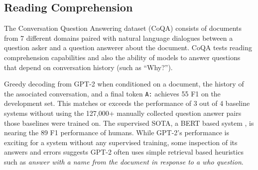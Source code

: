 \documentclass{article}
\begin{document}
\subsection{Reading Comprehension}
\label{qa}

The Conversation Question Answering dataset (CoQA) \citet{reddy2018coqa} consists of documents from 7 different domains paired with natural language dialogues between a question asker and a question answerer about the document. CoQA tests reading comprehension capabilities and also the ability of models to answer questions that depend on conversation history (such as ``Why?'').

Greedy decoding from GPT-2 when conditioned on a document, the history of the associated conversation, and a final token \texttt{A:} achieves 55 F1 on the development set. This matches or exceeds the performance of 3 out of 4 baseline systems without using the 127,000+ manually collected question answer pairs those baselines were trained on. The supervised SOTA, a BERT based system \cite{devlin2018bert}, is nearing the 89 F1 performance of humans. While GPT-2's performance is exciting for a system without any supervised training, some inspection of its answers and errors suggests GPT-2 often uses simple retrieval based heuristics such as \textit{answer with a name from the document in response to a who question}.


\end{document}
